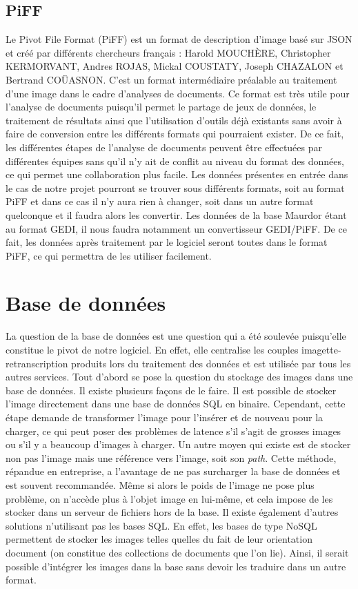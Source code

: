 \subsection{PiFF}

Le Pivot File Format (PiFF) est un format de description d'image basé sur JSON et créé par différents
chercheurs français : Harold MOUCHÈRE, Christopher KERMORVANT, Andres ROJAS, Mickal COUSTATY, Joseph CHAZALON
et Bertrand COÜASNON. C'est un format intermédiaire préalable au traitement d'une image dans le cadre
d'analyses de documents. Ce format est très utile pour l'analyse de documents puisqu'il permet le partage
de jeux de données, le traitement de résultats ainsi que l'utilisation d'outils déjà existants sans avoir à
faire de conversion entre les différents formats qui pourraient exister. De ce fait, les différentes étapes de
l'analyse de documents peuvent être effectuées par différentes équipes sans qu'il n'y ait de conflit au niveau
du format des données, ce qui permet une collaboration plus facile. Les données présentes en entrée dans le cas
de notre projet pourront se trouver sous différents formats, soit au format PiFF et dans ce cas il n'y aura rien
à changer, soit dans un autre format quelconque et il faudra alors les convertir. Les données de la base Maurdor
étant au format GEDI, il nous faudra notamment un convertisseur GEDI/PiFF. De ce fait, les données après traitement
par le logiciel seront toutes dans le format PiFF, ce qui permettra de les utiliser facilement.

\section{Base de données}

La question de la base de données est une question qui a été soulevée puisqu'elle constitue le pivot de notre
logiciel. En effet, elle centralise les couples imagette-retranscription produits lors du traitement des données
et est utilisée par tous les autres services. Tout d'abord se pose la question du stockage des images dans
une base de données. Il existe plusieurs façons de le faire. Il est possible de stocker l'image directement dans
une base de données SQL en binaire. Cependant, cette étape demande de transformer l'image pour l'insérer et de nouveau
pour la charger, ce qui peut poser des problèmes de latence s'il s'agit de grosses images ou s'il y a beaucoup
d'images à charger. Un autre moyen qui existe est de stocker non pas l'image mais une référence vers l'image,
soit son \textit{path}. Cette méthode, répandue en entreprise, a l'avantage de ne pas surcharger la base de données et
est souvent recommandée. Même si alors le poids de l'image ne pose plus problème, on n'accède plus à l'objet image en
lui-même, et cela impose de les stocker dans un serveur de fichiers hors de la base. Il existe également d'autres solutions
n'utilisant pas les bases SQL. En effet, les bases de type NoSQL permettent de stocker les images telles quelles du fait
de leur orientation document (on constitue des collections de documents que l'on lie). Ainsi, il serait possible d'intégrer
les images dans la base sans devoir les traduire dans un autre format.

